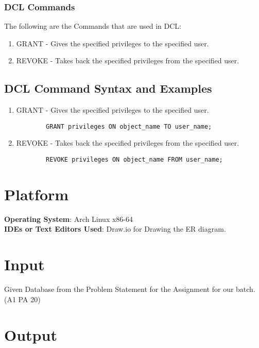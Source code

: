 \documentclass[11pt]{article}
\begin{document}
\subsubsection{DCL Commands}

The following are the Commands that are used in DCL:

\begin{enumerate}
	\item GRANT - Gives the specified privileges to the specified user.
	\item REVOKE - Takes back the specified privileges from the specified user.
\end{enumerate}

\subsection{DCL Command Syntax and Examples}

\begin{enumerate}
	\item GRANT - Gives the specified privileges to the specified user.
	      \begin{verbatim}
		GRANT privileges ON object_name TO user_name;
	\end{verbatim}
	\item REVOKE - Takes back the specified privileges from the specified user.
	      \begin{verbatim}
		REVOKE privileges ON object_name FROM user_name;
	\end{verbatim}
\end{enumerate}


\section{Platform}
\textbf{Operating System}: Arch Linux x86-64 \\
\textbf{IDEs or Text Editors Used}: Draw.io for Drawing the ER diagram. \\


\section{Input}
Given Database from the Problem Statement for the Assignment for our batch. (A1 PA 20)
\section{Output}

\end{document}
